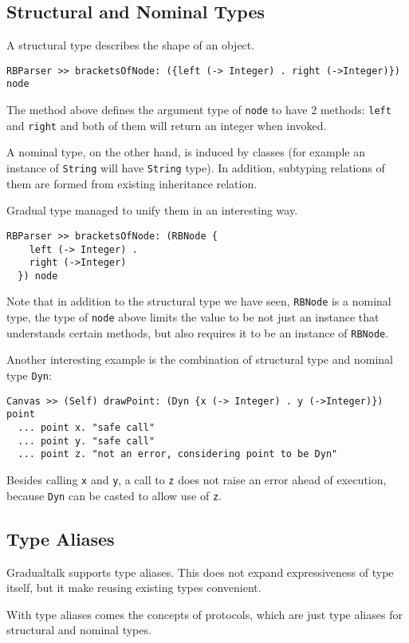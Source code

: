 \subsection{Structural and Nominal Types}

A structural type describes the shape of an object.

\begin{verbatim}
RBParser >> bracketsOfNode: ({left (-> Integer) . right (->Integer)}) node
\end{verbatim}

The method above defines the argument type of \texttt{node} to have 2 methods:
\texttt{left} and \texttt{right} and both of them will return an integer when invoked.

A nominal type, on the other hand, is induced by classes
(for example an instance of \texttt{String} will have \texttt{String} type).
In addition, subtyping relations of them are formed from existing inheritance relation.

Gradual type managed to unify them in an interesting way.

\begin{verbatim}
RBParser >> bracketsOfNode: (RBNode {
    left (-> Integer) .
    right (->Integer)
  }) node
\end{verbatim}

Note that in addition to the structural type we have seen,
\texttt{RBNode} is a nominal type, the type of \texttt{node} above
limits the value to be not just an instance that understands certain methods,
but also requires it to be an instance of \texttt{RBNode}.

Another interesting example is the combination of structural type
and nominal type \texttt{Dyn}:

\begin{verbatim}
Canvas >> (Self) drawPoint: (Dyn {x (-> Integer) . y (->Integer)}) point
  ... point x. "safe call"
  ... point y. "safe call"
  ... point z. "not an error, considering point to be Dyn"
\end{verbatim}

Besides calling \texttt{x} and \texttt{y}, a call to \texttt{z} does not
raise an error ahead of execution, because \texttt{Dyn} can be casted to allow use of
\texttt{z}.

\subsection{Type Aliases}

Gradualtalk supports type aliases. This does not expand expressiveness of type itself,
but it make reusing existing types convenient.

With type aliases comes the concepts of protocols, which are just type aliases
for structural and nominal types.
